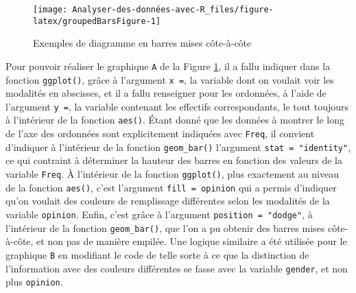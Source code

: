 \documentclass[
]{book}
\begin{document}
\begin{figure}

{\centering \texttt{[image: Analyser-des-données-avec-R\_files/figure-latex/groupedBarsFigure-1]} 

}

\caption{Exemples de diagramme en barres mises côte-à-côte}\label{fig:groupedBarsFigure}
\end{figure}

Pour pouvoir réaliser le graphique \texttt{A} de la Figure \ref{fig:groupedBarsFigure}, il a fallu indiquer dans la fonction \texttt{ggplot()}, grâce à l'argument \texttt{x\ =}, la variable dont on voulait voir les modalités en abscisses, et il a fallu renseigner pour les ordonnées, à l'aide de l'argument \texttt{y\ =}, la variable contenant les effectifs correspondants, le tout toujours à l'intérieur de la fonction \texttt{aes()}. Étant donné que les données à montrer le long de l'axe des ordonnées sont explicitement indiquées avec \texttt{Freq}, il convient d'indiquer à l'intérieur de la fonction \texttt{geom\_bar()} l'argument \texttt{stat\ =\ "identity"}, ce qui contraint à déterminer la hauteur des barres en fonction des valeurs de la variable \texttt{Freq}. À l'intérieur de la fonction \texttt{ggplot()}, plus exactement au niveau de la fonction \texttt{aes()}, c'est l'argument \texttt{fill\ =\ opinion} qui a permis d'indiquer qu'on voulait des couleurs de remplissage différentes selon les modalités de la variable \texttt{opinion}. Enfin, c'est grâce à l'argument \texttt{position\ =\ "dodge"}, à l'intérieur de la fonction \texttt{geom\_bar()}, que l'on a pu obtenir des barres mises côte-à-côte, et non pas de manière empilée. Une logique similaire a été utilisée pour le graphique \texttt{B} en modifiant le code de telle sorte à ce que la distinction de l'information avec des couleurs différentes se fasse avec la variable \texttt{gender}, et non plus \texttt{opinion}.
\end{document}
